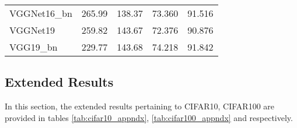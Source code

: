 \documentclass{article} \usepackage{lets_keepit_simple,times}
\begin{document}
\begin{table}[h!]
\begin{center}
\begin{tabular}{lcccc}
    VGGNet16\_bn \cite{Simonyan_VGG_2014}                              & 265.99     & 138.37           & 73.360               & 91.516  \\
    VGGNet19 \cite{Simonyan_VGG_2014}                                  & 259.82     & 143.67           & 72.376              & 90.876   \\
    VGG19\_bn \cite{Simonyan_VGG_2014}                              & 229.77     & 143.68           & 74.218              & 91.842  \\
    \end{tabular}
    \end{center}
    \end{table}
    
\subsection{Extended Results}
In this section, the extended results pertaining to CIFAR10, CIFAR100 are provided in tables \ref{tab:cifar10_appndx}, \ref{tab:cifar100_appndx} and respectively.\\ 
\end{document}
